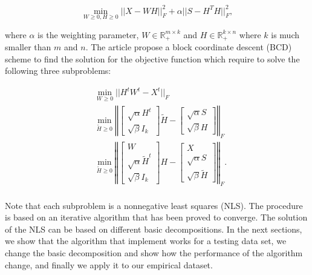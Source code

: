 \documentclass[11pt,letter]{article}%
\numberwithin{equation}{section}
\begin{document}
\begin{equation}
\min\limits_{W\geq 0,H \geq 0} ||X-WH||^{2}_{F}+\alpha||S-H^{T}H||^{2}_{F},
\end{equation}

where $\alpha$ is the weighting parameter, $W \in \mathbb{R}_{+}^{m \times k}$ and $H \in \mathbb{R}_{+}^{k \times n}$ where $k$ is much smaller than $m$ and $n$. The article propose a block coordinate descent (BCD) scheme to find the solution for the objective function which require to solve the following three subproblems:

\begin{align}
&\min\limits_{W\geq 0} ||H^{t}W^{t}-X^{t}||_{F} \\
&\min\limits_{\tilde{H}\geq 0} \left\Vert \begin{bmatrix}\sqrt{\alpha}H^{t}  \\ \sqrt{\beta} I_k \end{bmatrix} \tilde{H} - \begin{bmatrix}\sqrt{\alpha}S  \\ \sqrt{\beta} H \end{bmatrix}\right\Vert_{F}\\
&\min\limits_{\tilde{H}\geq 0} \left\Vert \begin{bmatrix} W \\ \sqrt{\alpha} \tilde{H}^{t} \\ \sqrt{\beta} I_k \end{bmatrix} H - \begin{bmatrix} X \\ \sqrt{\alpha} S \\ \sqrt{\beta} \tilde{H} \end{bmatrix}\right\Vert_{F}.\\
\end{align}

Note that each subproblem is a nonnegative least squares (NLS). The procedure is based on an iterative algorithm that has been proved to converge. The solution of the NLS can be based on different basic decompositions. In the next sections, we show that the algorithm that implement works for a testing data set, we change the basic decomposition and show how the performance of the algorithm change, and finally we apply it to our empirical dataset.  
\end{document}
